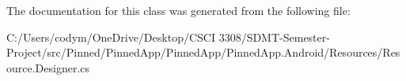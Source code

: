 The documentation for this class was generated from the following file\+:\begin{DoxyCompactItemize}
\item 
C\+:/\+Users/codym/\+One\+Drive/\+Desktop/\+C\+S\+C\+I 3308/\+S\+D\+M\+T-\/\+Semester-\/\+Project/src/\+Pinned/\+Pinned\+App/\+Pinned\+App/\+Pinned\+App.\+Android/\+Resources/Resource.\+Designer.\+cs\end{DoxyCompactItemize}
